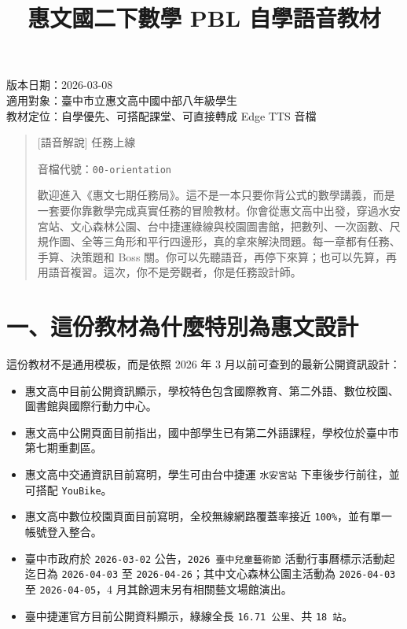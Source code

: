 \documentclass[
  chinese,
  12pt,
  a4paper,
  oneside]{article}
\title{惠文國二下數學 PBL 自學語音教材}
\author{}
\date{}
\providecommand{\tightlist}{%
  \setlength{\itemsep}{0pt}\setlength{\parskip}{0pt}}
\begin{document}
\maketitle

{
\setcounter{tocdepth}{2}
\tableofcontents
}
版本日期：2026-03-08\\
適用對象：臺中市立惠文高中國中部八年級學生\\
教材定位：自學優先、可搭配課堂、可直接轉成 Edge TTS 音檔

\begin{quote}
{[}語音解說{]} 任務上線

音檔代號：\texttt{00-orientation}

歡迎進入《惠文七期任務局》。這不是一本只要你背公式的數學講義，而是一套要你靠數學完成真實任務的冒險教材。你會從惠文高中出發，穿過水安宮站、文心森林公園、台中捷運綠線與校園圖書館，把數列、一次函數、尺規作圖、全等三角形和平行四邊形，真的拿來解決問題。每一章都有任務、手算、決策題和
Boss
關。你可以先聽語音，再停下來算；也可以先算，再用語音複習。這次，你不是旁觀者，你是任務設計師。
\end{quote}

\section{一、這份教材為什麼特別為惠文設計}\label{ux4e00ux9019ux4efdux6559ux6750ux70baux4ec0ux9ebcux7279ux5225ux70baux60e0ux6587ux8a2dux8a08}

這份教材不是通用模板，而是依照 2026 年 3
月以前可查到的最新公開資訊設計：

\begin{itemize}
\tightlist
\item
  惠文高中目前公開資訊顯示，學校特色包含國際教育、第二外語、數位校園、圖書館與國際行動力中心。
\item
  惠文高中公開頁面目前指出，國中部學生已有第二外語課程，學校位於臺中市第七期重劃區。
\item
  惠文高中交通資訊目前寫明，學生可由台中捷運 \texttt{水安宮站}
  下車後步行前往，並可搭配 \texttt{YouBike}。
\item
  惠文高中數位校園頁面目前寫明，全校無線網路覆蓋率接近
  \texttt{100\%}，並有單一帳號登入整合。
\item
  臺中市政府於 \texttt{2026-03-02} 公告，\texttt{2026\ 臺中兒童藝術節}
  活動行事曆標示活動起迄日為 \texttt{2026-04-03} 至
  \texttt{2026-04-26}；其中文心森林公園主活動為 \texttt{2026-04-03} 至
  \texttt{2026-04-05}，4 月其餘週末另有相關藝文場館演出。
\item
  臺中捷運官方目前公開資料顯示，綠線全長 \texttt{16.71\ 公里}、共
  \texttt{18\ 站}。
\end{itemize}
\end{document}
